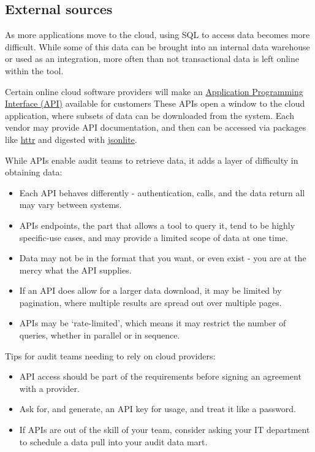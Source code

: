 \documentclass[
]{book}
\providecommand{\tightlist}{%
  \setlength{\itemsep}{0pt}\setlength{\parskip}{0pt}}
\begin{document}
\hypertarget{external-sources}{%
\subsection{External sources}\label{external-sources}}

As more applications move to the cloud, using SQL to access data becomes more difficult. While some of this data can be brought into an internal data warehouse or used as an integration, more often than not transactional data is left online within the tool.

Certain online cloud software providers will make an \protect\hyperlink{APIs}{Application Programming Interface (API)} available for customers These APIs open a window to the cloud application, where subsets of data can be downloaded from the system. Each vendor may provide API documentation, and then can be accessed via packages like \href{https://cran.r-project.org/web/packages/httr/index.html}{httr} and digested with \href{https://cran.r-project.org/web/packages/jsonlite/index.html}{jsonlite}.

While APIs enable audit teams to retrieve data, it adds a layer of difficulty in obtaining data:

\begin{itemize}
\tightlist
\item
  Each API behaves differently - authentication, calls, and the data return all may vary between systems.
\item
  APIs endpoints, the part that allows a tool to query it, tend to be highly specific-use cases, and may provide a limited scope of data at one time.
\item
  Data may not be in the format that you want, or even exist - you are at the mercy what the API supplies.
\item
  If an API does allow for a larger data download, it may be limited by pagination, where multiple results are spread out over multiple pages.
\item
  APIs may be `rate-limited', which means it may restrict the number of queries, whether in parallel or in sequence.
\end{itemize}

Tips for audit teams needing to rely on cloud providers:

\begin{itemize}
\tightlist
\item
  API access should be part of the requirements before signing an agreement with a provider.
\item
  Ask for, and generate, an API key for usage, and treat it like a password.
\item
  If APIs are out of the skill of your team, consider asking your IT department to schedule a data pull into your audit data mart.
\end{itemize}
\end{document}
